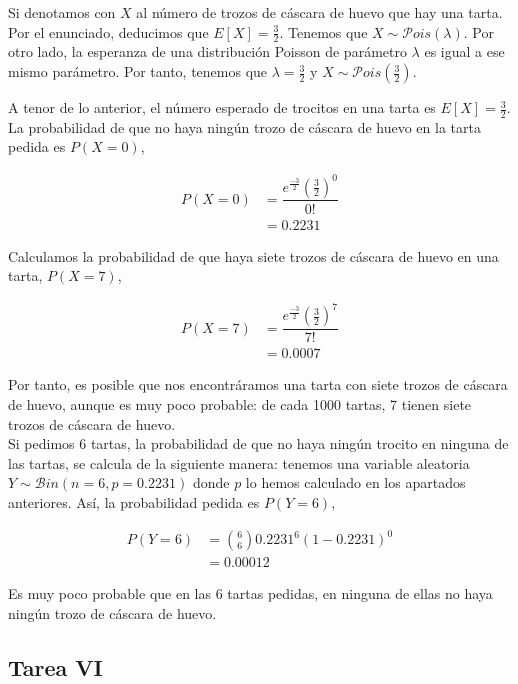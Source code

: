 \documentclass[12pt,a4paper,twoside,openright,titlepage,final]{article}
\begin{document}
Si denotamos con $X$ al número de trozos de cáscara de huevo que hay una tarta. Por el enunciado, deducimos que $E[X] = \frac{3}{2}$. Tenemos que $X \sim \mathcal{P}ois(\lambda)$. Por otro lado, la esperanza de una distribución Poisson de parámetro $\lambda$ es igual a ese mismo parámetro. Por tanto, tenemos que $\lambda = \frac{3}{2}$ y $X \sim \mathcal{P}ois(\frac{3}{2})$.

A tenor de lo anterior, el número esperado de trocitos en una tarta es $E[X] = \frac{3}{2}$.\\

La probabilidad de que no haya ningún trozo de cáscara de huevo en la tarta pedida es $P(X=0)$,

\begin{align*}
P(X=0) & = \dfrac{e^{\frac{-3}{2}} \left(\frac{3}{2}\right)^0 }{0!} \\ & = 0.2231
\end{align*}

Calculamos la probabilidad de que haya siete trozos de cáscara de huevo en una tarta, $P(X=7)$,

\begin{align*}
P(X=7) & = \dfrac{e^{\frac{-3}{2}} \left(\frac{3}{2}\right)^7}{7!} \\ & = 0.0007
\end{align*}

Por tanto, es posible que nos encontráramos una tarta con siete trozos de cáscara de huevo, aunque es muy poco probable: de cada 1000 tartas, 7 tienen siete trozos de cáscara de huevo.\\

Si pedimos 6 tartas, la probabilidad de que no haya ningún trocito en ninguna de las tartas, se calcula de la siguiente manera: tenemos una variable aleatoria $Y \sim \mathcal{B}in(n=6, p = 0.2231)$ donde $p$ lo hemos calculado en los apartados anteriores. Así, la probabilidad pedida es $P(Y = 6)$,

\begin{align*}
P(Y=6) & = \binom{6}{6}0.2231^6 (1-0.2231)^0 \\ & = 0.00012
\end{align*}

Es muy poco probable que en las 6 tartas pedidas, en ninguna de ellas no haya ningún trozo de cáscara de huevo.

\subsection{Tarea VI}
\end{document}
